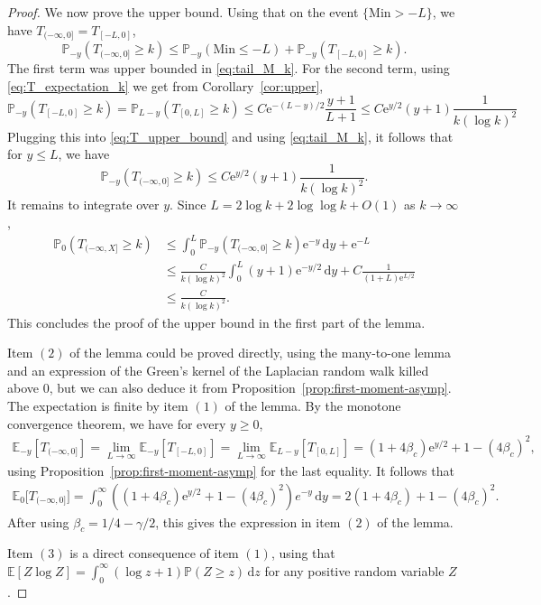 \documentclass[a4paper, a4wide, 10pt, reqno]{amsart}
\theoremstyle{plain}
\theoremstyle{definition}
\numberwithin{equation}{section}
\newcommand{\E}{\mathbb E}
\newcommand{\Prob}{\mathbb{P}}
\newcommand{\re}{{\mathrm e}}
\newcommand{\rd}{\mathrm{d}}
\begin{document}
\begin{proof}
	 We now prove the upper bound. Using that on the event $\{\mathrm{Min}>-L\}$, we have $T_{(-\infty,0]} = T_{[-L,0]}$, 
	 \begin{equation}
	 	\label{eq:T_upper_bound}
	 	\Prob_{-y}(T_{(-\infty,0]} \ge k) \le \Prob_{-y}(\mathrm{Min}\le -L) + \Prob_{-y}(T_{[-L,0]} \ge k).
	 \end{equation}
	 The first term was upper bounded in \eqref{eq:tail_M_k}. For the second term, using \eqref{eq:T_expectation_k} we get from Corollary~\ref{cor:upper},
	 \[
	 \Prob_{-y}(T_{[-L,0]} \ge k) = \Prob_{L-y}(T_{[0,L]}\ge k) \le C \re^{-(L-y)/2} \frac{y+1}{L+1} \le C \re^{y/2}(y+1)\frac 1 {k(\log k)^2}
	 \]
	 Plugging this into \eqref{eq:T_upper_bound} and using \eqref{eq:tail_M_k}, it follows that for $y\le L$, we have
	 \begin{equation}
	 	\label{eq:T_upper_bound_k}
	 	\Prob_{-y}(T_{(-\infty,0]} \ge k) \le C \re^{y/2}(y+1)\frac 1 {k(\log k)^2}.
	 \end{equation}
	 It remains to integrate over $y$. Since $L = 2\log k + 2\log\log k+ O(1)$ as $k\to\infty$, 
	 \begin{align*}
	 \Prob_{0}(T_{(-\infty,X]} \ge k) 
	 &\le \int_0^L \Prob_{-y}(T_{(-\infty,0]} \ge k)\re^{-y}\,\rd y + \re^{-L}\\
	 &\le \frac C {k(\log k)^2}\int_0^L (y+1)\re^{-y/2}\,\rd y + C\frac{1}{(1+L)\re^{L/2}}\\
	 &\le \frac{C}{k(\log k)^2}.
	 \end{align*}
	 This concludes the proof of the upper bound in the first part of the lemma.\smallskip
	 
	 Item $(2)$ of the lemma could be proved directly, using the many-to-one lemma and an expression of the Green's kernel of the Laplacian random walk killed above 0, but we can also deduce it from Proposition~\ref{prop:first-moment-asymp}. The expectation is finite by item $(1)$ of the lemma. By the monotone convergence theorem, we have for every $y\ge 0$,
	 \begin{align*}
	 \E_{-y}[T_{(-\infty,0]}] 
	 = \lim_{L\to\infty} \E_{-y}[T_{[-L,0]}] 
	 = \lim_{L\to\infty}\E_{L-y}[T_{[0,L]}]
	 = (1+4\beta_c)\re^{y/2} + 1-(4\beta_c)^2,
	 \end{align*}
	 using Proposition~\ref{prop:first-moment-asymp} for the last equality. It follows that
	 \begin{align*}
	 \E_{0}\big[T_{(-\infty,0]}\big] 
	 = \int_0^\infty \left((1+4\beta_c)\re^{y/2} + 1-(4\beta_c)^2\right) e^{-y}\,\rd y
	 = 2(1+4\beta_c) + 1 - (4\beta_c)^2.
	 \end{align*}
	 After using $\beta_c=1/4-\gamma/2$, this gives the expression in item $(2)$ of the lemma.\smallskip
	 
	 Item $(3)$ is a direct consequence of item $(1)$, using that $\E[Z\log Z] = \int_0^\infty (\log z+1) \Prob(Z\ge z)\,\rd z$ for any positive random variable $Z$.
 \end{proof}
\end{document}
